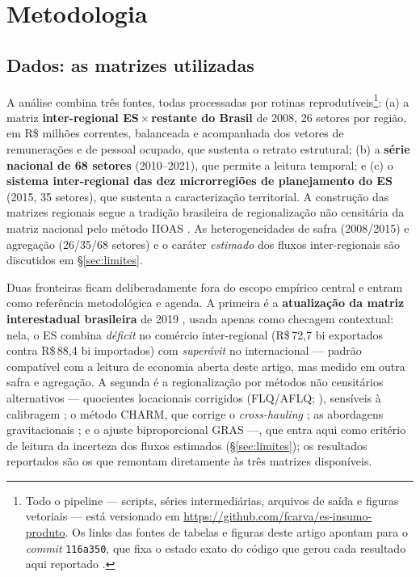 \documentclass[11pt,a4paper]{article}
\begin{document}
\section{Metodologia}
\label{sec:metodo}
\subsection{Dados: as matrizes utilizadas}
\label{sec:dados}
A análise combina três fontes, todas processadas por rotinas
reprodutíveis\footnote{Todo o pipeline --- scripts, séries intermediárias, arquivos de saída e
figuras vetoriais --- está versionado em \url{https://github.com/fcarva/es-insumo-produto}. Os
links das fontes de tabelas e figuras deste artigo apontam para o \emph{commit}
\texttt{116a350}, que fixa o estado exato do código que gerou cada resultado aqui reportado
\citep{carvalho2026repo}.}: (a) a matriz \textbf{inter-regional ES\,$\times$\,restante do
Brasil} de 2008, 26 setores por região, em R\$ milhões correntes, balanceada e
acompanhada dos vetores de remunerações e de pessoal ocupado, que sustenta o retrato
estrutural; (b) a \textbf{série nacional de 68 setores} (2010--2021), que permite a leitura
temporal; e (c) o \textbf{sistema inter-regional das dez microrregiões de planejamento do ES}
(2015, 35 setores), que sustenta a caracterização territorial. A construção das matrizes
regionais segue a tradição brasileira de regionalização não censitária da matriz nacional
\citep{guilhoto2005estimacao,round1983nonsurvey} pelo método IIOAS \citep{haddad2017iioas}. As
heterogeneidades de safra (2008/2015) e agregação (26/35/68 setores) e o caráter
\emph{estimado} dos fluxos inter-regionais são discutidos em \S\ref{sec:limites}.

Duas fronteiras ficam deliberadamente fora do escopo empírico central e entram como referência
metodológica e agenda. A primeira é a \textbf{atualização da matriz interestadual brasileira}
de 2019 \citep{haddad2025matriz}, usada apenas como checagem contextual: nela, o ES combina
\emph{déficit} no comércio inter-regional (R\$\,72,7 bi exportados contra R\$\,88,4 bi
importados) com \emph{superávit} no internacional --- padrão compatível com a leitura de
economia aberta deste artigo, mas medido em outra safra e agregação. A segunda é a
regionalização por métodos não censitários alternativos --- quocientes locacionais corrigidos
(FLQ/AFLQ; \citealp{flegg1995lq,flegg2000flq}), sensíveis à calibragem
\citep{flegg2016evaluating}; o método CHARM, que corrige o \emph{cross-hauling}
\citep{tobben2015charm}; as abordagens gravitacionais \citep{riddington2006comparison}; e o
ajuste biproporcional GRAS \citep{junius2003gras} ---, que entra aqui como critério de leitura
da incerteza dos fluxos estimados (\S\ref{sec:limites}); os resultados reportados são os que
remontam diretamente às três matrizes disponíveis.
\end{document}
